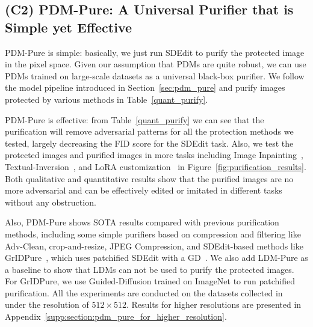 \documentclass{article}
\newcommand{\chen}[1]{{\color{cyan}{#1}}}
\newcommand{\haotian}[1]{{\color{red}{#1}}}
\begin{document}
\subsection{(C2) PDM-Pure: A Universal Purifier that is Simple yet Effective}

PDM-Pure is simple: basically, we just run SDEdit to purify the protected image in the pixel space. Given our assumption that PDMs are quite robust, we can use PDMs trained on large-scale datasets as a universal black-box purifier. We follow the model pipeline introduced in Section~\ref{sec:pdm_pure} and purify images protected by various methods in Table~\ref{quant_purify}.

PDM-Pure is effective: from Table~\ref{quant_purify} we can see that the purification will remove adversarial patterns for all the protection methods we tested, largely decreasing the FID score for the SDEdit task. Also, we test the protected images and purified images in more tasks including Image Inpainting~\cite{song2020score}, Textual-Inversion~\cite{textualinversion}, and LoRA customization~\cite{lora} in Figure~\ref{fig:purification_results}. Both qualitative and quantitative results show that the purified images are no more adversarial and can be effectively edited or imitated in different tasks without any obstruction. 

Also, PDM-Pure shows SOTA results compared with previous purification methods, including some simple purifiers based on compression and filtering like Adv-Clean, crop-and-resize, JPEG Compression, and  SDEdit-based methods like GrIDPure~\cite{zhao2023can}, which uses patchified SDEdit with a GD~\cite{guideddiffusion}. We also add LDM-Pure as a baseline to show that LDMs can not be used to purify the protected images. For GrIDPure, we use Guided-Diffusion trained on ImageNet to run patchified purification. All the experiments are conducted on the datasets collected in ~\cite{sdsattack} under the resolution of $512\times 512$. Results for higher resolutions are presented in Appendix~\ref{supp:section:pdm_pure_for_higher_resolution}.





\end{document}
